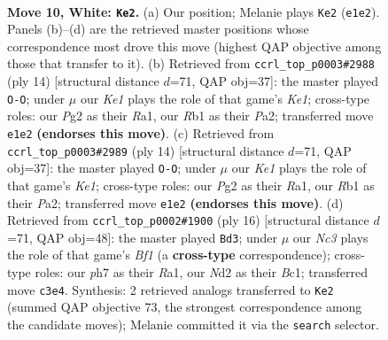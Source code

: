\documentclass[11pt]{article}
\begin{document}
\clearpage

\begin{figure}[p]\centering
\begin{subfigure}{0.46\textwidth}\centering
\resizebox{\linewidth}{!}{%
\newchessgame
\chessboard[
  setfen={rnbqk1r1/pp2bp1p/4p1p1/2Pp3n/3P4/2N5/PP1N1PPP/1RBQKB1R w Kq - 0 10},
  showmover=false,
  pgfstyle=straightmove, color=movearrow, markmove={e1-e2}
]}
\caption{}
\end{subfigure}\hfill
\begin{subfigure}{0.46\textwidth}\centering
\resizebox{\linewidth}{!}{%
\newchessgame
\chessboard[
  setfen={rn1qkb1r/pb3ppp/1p1ppn2/8/2PNP3/2N5/PP2BPPP/R1BQK2R w KQkq - 2 8},
  showmover=false,
  pgfstyle=straightmove, color=movearrow, markmove={e1-g1}
]}
\caption{}
\end{subfigure}
\\[4pt]
\begin{subfigure}{0.46\textwidth}\centering
\resizebox{\linewidth}{!}{%
\newchessgame
\chessboard[
  setfen={rn1qkb1r/pb3ppp/1p1ppn2/8/2PNP3/2N5/PP2BPPP/R1BQK2R w KQkq - 2 8},
  showmover=false,
  pgfstyle=straightmove, color=movearrow, markmove={e1-g1}
]}
\caption{}
\end{subfigure}\hfill
\begin{subfigure}{0.46\textwidth}\centering
\resizebox{\linewidth}{!}{%
\newchessgame
\chessboard[
  setfen={r2qkbnr/1p1b1ppp/p1n1p3/3pP3/3P4/N1P2N2/5PPP/R1BQKB1R w KQkq - 0 9},
  showmover=false,
  pgfstyle=straightmove, color=movearrow, markmove={f1-d3}
]}
\caption{}
\end{subfigure}
\caption{\textbf{Move 10, White: \texttt{Ke2}.} (a) Our position; Melanie plays \texttt{Ke2} (\texttt{e1e2}). Panels (b)--(d) are the retrieved master positions whose correspondence most drove this move (highest QAP objective among those that transfer to it). (b) Retrieved from \texttt{ccrl\_top\_p0003\#2988} (ply 14) [structural distance $d$=71, QAP obj=37]: the master played \texttt{O-O}; under $\mu$ our \emph{Ke1} plays the role of that game's \emph{Ke1}; cross-type roles: our \emph{P}g2 as their \emph{R}a1, our \emph{R}b1 as their \emph{P}a2; transferred move \texttt{e1e2} \textbf{(endorses this move)}. (c) Retrieved from \texttt{ccrl\_top\_p0003\#2989} (ply 14) [structural distance $d$=71, QAP obj=37]: the master played \texttt{O-O}; under $\mu$ our \emph{Ke1} plays the role of that game's \emph{Ke1}; cross-type roles: our \emph{P}g2 as their \emph{R}a1, our \emph{R}b1 as their \emph{P}a2; transferred move \texttt{e1e2} \textbf{(endorses this move)}. (d) Retrieved from \texttt{ccrl\_top\_p0002\#1900} (ply 16) [structural distance $d$=71, QAP obj=48]: the master played \texttt{Bd3}; under $\mu$ our \emph{Nc3} plays the role of that game's \emph{Bf1} (a \textbf{cross-type} correspondence); cross-type roles: our \emph{p}h7 as their \emph{R}a1, our \emph{N}d2 as their \emph{B}c1; transferred move \texttt{c3e4}. Synthesis: 2 retrieved analogs transferred to \texttt{Ke2} (summed QAP objective 73, the strongest correspondence among the candidate moves); Melanie committed it via the \texttt{search} selector.}
\label{fig:thought-m18}
\end{figure}
\end{document}
